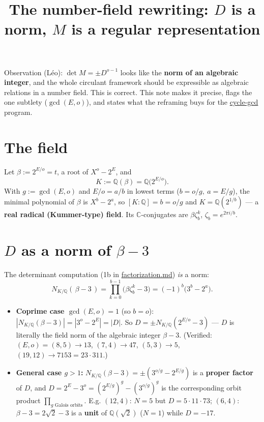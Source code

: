 \documentclass[11pt]{article}
\title{The number-field rewriting: $D$ is a norm, $M$ is a regular representation}
\author{}
\date{}
\begin{document}
\maketitle

Observation (Léo): $\det M=\pm D^{o-1}$ looks like the \textbf{norm of an algebraic integer}, and the whole circulant framework should be expressible as algebraic relations in a number field. This is correct. This note makes it precise, flags the one subtlety ($\gcd(E,o)$), and states what the reframing buys for the \href{../cycle-gcd/STATUS.md}{cycle-gcd} program.

\section{The field}

Let $\beta:=2^{E/o}=t$, a root of $X^o-2^E$, and
\[
K:=\mathbb Q(\beta)=\mathbb Q\big(2^{E/o}\big).
\]
With $g:=\gcd(E,o)$ and $E/o=a/b$ in lowest terms ($b=o/g,\ a=E/g$), the minimal polynomial of $\beta$ is $X^{b}-2^{a}$, so $[K:\mathbb Q]=b=o/g$ and $K=\mathbb Q(2^{1/b})$ --- a \textbf{real radical (Kummer-type) field}. Its $\mathbb C$-conjugates are $\beta\zeta_b^{k}$, $\zeta_b=e^{2\pi i/b}$.

\section{$D$ as a norm of $\beta-3$}

The determinant computation (1b in \href{factorization.md}{factorization.md}) \textit{is} a norm:
\[
N_{K/\mathbb Q}(\,\beta-3\,)=\prod_{k=0}^{b-1}\big(\beta\zeta_b^{k}-3\big)=(-1)^{b}\big(3^{b}-2^{a}\big).
\]

\begin{itemize}
    \item \textbf{Coprime case $\gcd(E,o)=1$} (so $b=o$): $|N_{K/\mathbb Q}(\beta-3)|=|3^{o}-2^{E}|=|D|$. So $\boxed{D=\pm N_{K/\mathbb Q}(2^{E/o}-3)}$ --- $D$ is literally the field norm of the algebraic integer $\beta-3$. (Verified: $(E,o)=(8,5)\to 13$, $(7,4)\to 47$, $(5,3)\to 5$, $(19,12)\to 7153=23\cdot 311$.)
    \item \textbf{General case $g > 1$:} $N_{K/\mathbb Q}(\beta-3)=\pm(3^{o/g}-2^{E/g})$ is a \textbf{proper factor} of $D$, and $D=2^E-3^o=(2^{E/g})^{g}-(3^{o/g})^{g}$ is the corresponding orbit product $\prod_{\text{$g$ Galois orbits}}$. E.g. $(12,4)$: $N=5$ but $D=5\cdot 11\cdot 73$; $(6,4)$: $\beta-3=2\sqrt2-3$ is a \textbf{unit} of $\mathbb Q(\sqrt2)$ ($N=1$) while $D=-17$.
\end{itemize}
\end{document}
